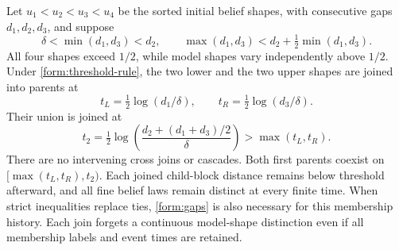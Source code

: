 Let $u_1<u_2<u_3<u_4$ be the sorted initial belief shapes, with consecutive
gaps $d_1,d_2,d_3$, and suppose
\begin{equation}
 \delta<\min(d_1,d_3)<d_2,\qquad \max(d_1,d_3)<d_2+\tfrac12\min(d_1,d_3).
 \label{form:gaps}
\end{equation}
All four shapes exceed $1/2$, while model shapes vary independently above
$1/2$. Under \cref{form:threshold-rule}, the two lower and the two upper shapes
are joined into parents at
\begin{equation}
 t_L=\tfrac12\log(d_1/\delta),\qquad
 t_R=\tfrac12\log(d_3/\delta).
 \label{form:first-times}
\end{equation}
Their union is joined at
\begin{equation}
 t_2=\tfrac12\log\left(\frac{d_2+(d_1+d_3)/2}{\delta}\right)
 >\max(t_L,t_R).
 \label{form:second-time}
\end{equation}
There are no intervening cross joins or cascades. Both first parents coexist
on $[\max(t_L,t_R),t_2)$. Each joined child-block distance remains below
threshold afterward, and all fine belief laws remain distinct at every finite
time. When strict inequalities replace ties, \cref{form:gaps} is also necessary for this membership history. Each join forgets a continuous model-shape distinction even if all
membership labels and event times are retained.


